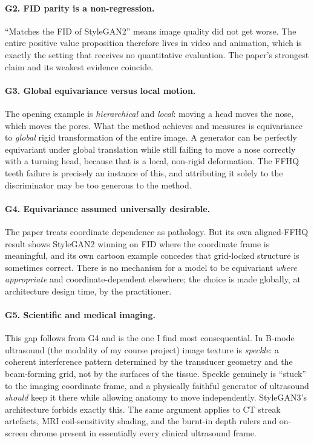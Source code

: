 \documentclass[11pt,a4paper]{article}
\begin{document}
\paragraph{G2. FID parity is a non-regression.}
``Matches the FID of StyleGAN2'' means image quality did not get worse. The
entire positive value proposition therefore lives in video and animation, which is
exactly the setting that receives no quantitative evaluation. The paper's strongest
claim and its weakest evidence coincide.

\paragraph{G3. Global equivariance versus local motion.} The opening example
is \emph{hierarchical} and \emph{local}: moving a head moves the nose, which moves
the pores. What the method achieves and measures is equivariance to \emph{global}
rigid transformation of the entire image. A generator can be perfectly equivariant
under global translation while still failing to move a nose correctly with a
turning head, because that is a local, non-rigid deformation. The FFHQ teeth
failure is precisely an instance of this, and attributing it solely to the
discriminator may be too generous to the method.

\paragraph{G4. Equivariance assumed universally desirable.} The paper
treats coordinate dependence as pathology. But its own aligned-FFHQ result shows
StyleGAN2 winning on FID where the coordinate frame is meaningful, and its own
cartoon example concedes that grid-locked structure is sometimes correct. There is
no mechanism for a model to be equivariant \emph{where appropriate} and
coordinate-dependent elsewhere; the choice is made globally, at architecture
design time, by the practitioner.

\paragraph{G5. Scientific and medical imaging.} This gap follows
from G4 and is the one I find most consequential. In B-mode ultrasound (the
modality of my course project) image texture is \emph{speckle}: a coherent
interference pattern determined by the transducer geometry and the beam-forming
grid, not by the surfaces of the tissue. Speckle genuinely is ``stuck'' to the
imaging coordinate frame, and a physically faithful generator of ultrasound
\emph{should} keep it there while allowing anatomy to move independently.
StyleGAN3's architecture forbids exactly this. The same argument applies to CT
streak artefacts, MRI coil-sensitivity shading, and the burnt-in depth rulers and
on-screen chrome present in essentially every clinical ultrasound frame.
\end{document}
